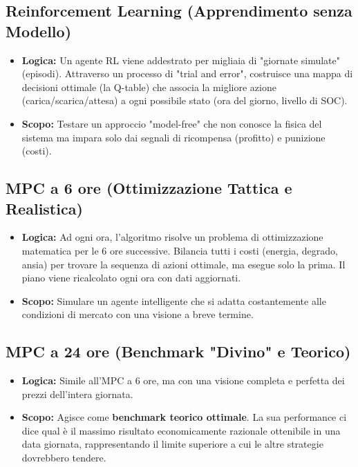 \documentclass[11pt, a4paper]{article}
\begin{document}
\subsection{Reinforcement Learning (Apprendimento senza Modello)}
\begin{itemize}
    \item \textbf{Logica:} Un agente RL viene addestrato per migliaia di "giornate simulate" (episodi). Attraverso un processo di "trial and error", costruisce una mappa di decisioni ottimale (la Q-table) che associa la migliore azione (carica/scarica/attesa) a ogni possibile stato (ora del giorno, livello di SOC).
    \item \textbf{Scopo:} Testare un approccio "model-free" che non conosce la fisica del sistema ma impara solo dai segnali di ricompensa (profitto) e punizione (costi).
\end{itemize}

\subsection{MPC a 6 ore (Ottimizzazione Tattica e Realistica)}
\begin{itemize}
    \item \textbf{Logica:} Ad ogni ora, l'algoritmo risolve un problema di ottimizzazione matematica per le 6 ore successive. Bilancia tutti i costi (energia, degrado, ansia) per trovare la sequenza di azioni ottimale, ma esegue solo la prima. Il piano viene ricalcolato ogni ora con dati aggiornati.
    \item \textbf{Scopo:} Simulare un agente intelligente che si adatta costantemente alle condizioni di mercato con una visione a breve termine.
\end{itemize}

\subsection{MPC a 24 ore (Benchmark "Divino" e Teorico)}
\begin{itemize}
    \item \textbf{Logica:} Simile all'MPC a 6 ore, ma con una visione completa e perfetta dei prezzi dell'intera giornata.
    \item \textbf{Scopo:} Agisce come \textbf{benchmark teorico ottimale}. La sua performance ci dice qual è il massimo risultato economicamente razionale ottenibile in una data giornata, rappresentando il limite superiore a cui le altre strategie dovrebbero tendere.
\end{itemize}
\end{document}
